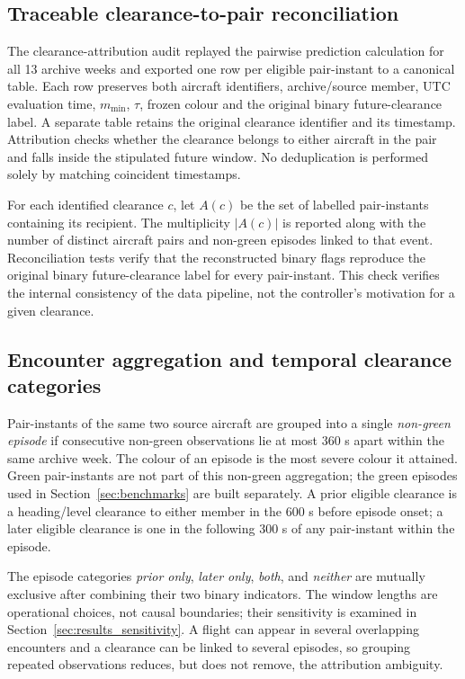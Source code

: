 \documentclass[aerospace,article,submit,moreauthors]{Definitions/mdpi}
\newcommand{\mmin}{m_{\min}}
\begin{document}
\subsection{Traceable clearance-to-pair reconciliation}\label{sec:attribution}
The clearance-attribution audit replayed the pairwise prediction calculation for all 13 archive weeks and exported one row per eligible pair-instant to a canonical table. Each row preserves both aircraft identifiers, archive/source member, UTC evaluation time, $\mmin$, $\tau$, frozen colour and the original binary future-clearance label. A separate table retains the original clearance identifier and its timestamp. Attribution checks whether the clearance belongs to either aircraft in the pair and falls inside the stipulated future window. No deduplication is performed solely by matching coincident timestamps.

For each identified clearance $c$, let $A(c)$ be the set of labelled pair-instants containing its recipient. The multiplicity $|A(c)|$ is reported along with the number of distinct aircraft pairs and non-green episodes linked to that event. Reconciliation tests verify that the reconstructed binary flags reproduce the original binary future-clearance label for every pair-instant. This check verifies the internal consistency of the data pipeline, not the controller's motivation for a given clearance.

\subsection{Encounter aggregation and temporal clearance categories}\label{sec:encounters}
Pair-instants of the same two source aircraft are grouped into a single \emph{non-green episode} if consecutive non-green observations lie at most 360 s apart within the same archive week. The colour of an episode is the most severe colour it attained. Green pair-instants are not part of this non-green aggregation; the green episodes used in Section~\ref{sec:benchmarks} are built separately. A prior eligible clearance is a heading/level clearance to either member in the 600 s before episode onset; a later eligible clearance is one in the following 300 s of any pair-instant within the episode.

The episode categories \emph{prior only}, \emph{later only}, \emph{both}, and \emph{neither} are mutually exclusive after combining their two binary indicators. The window lengths are operational choices, not causal boundaries; their sensitivity is examined in Section~\ref{sec:results_sensitivity}. A flight can appear in several overlapping encounters and a clearance can be linked to several episodes, so grouping repeated observations reduces, but does not remove, the attribution ambiguity.
\end{document}

